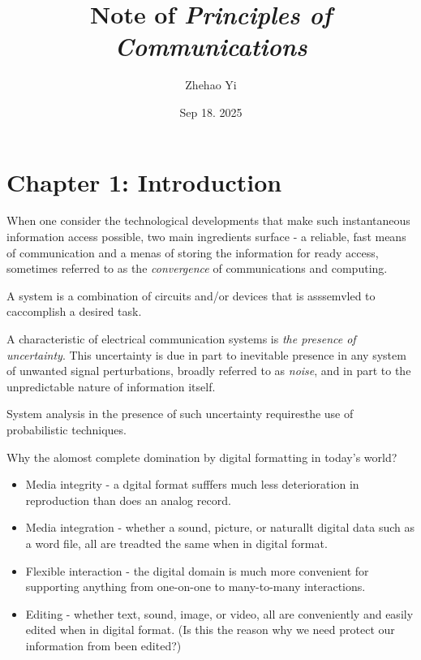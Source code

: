 \documentclass[12pt,a4paper]{book}
\title{Note of \textit{Principles of Communications}}
\author{Zhehao Yi}
\date{Sep 18. 2025}
\begin{document}
\maketitle
\tableofcontents
\newpage

\chapter{Chapter 1: Introduction}
When one consider the technological developments that make such instantaneous information access possible, two main ingredients surface - a reliable, fast means of communication and a menas of storing the information for ready access, sometimes referred to as the \textit{convergence} of communications and computing.

A system is a combination of circuits and/or devices that is asssemvled to caccomplish a desired task.

A characteristic of electrical communication systems is \textit{the presence of uncertainty}. This uncertainty is due in part to inevitable presence in any system of unwanted signal perturbations, broadly referred to as \textit{noise}, and in part to the unpredictable nature of information itself.

System analysis in the presence of such uncertainty requiresthe use of probabilistic techniques.

Why the alomost complete domination by digital formatting in today's world?
\begin{itemize}
  \item Media integrity - a dgital format sufffers much less deterioration in reproduction than does an analog record.
  \item Media integration - whether a sound, picture, or naturallt digital data such as a word file, all are treadted the same when in digital format.
  \item Flexible interaction - the digital domain is much more convenient for supporting anything from one-on-one to many-to-many interactions.
  \item Editing - whether text, sound, image, or video, all are conveniently and easily edited when in digital format. (Is this the reason why we need protect our information from been edited?)
\end{itemize}
\end{document}
